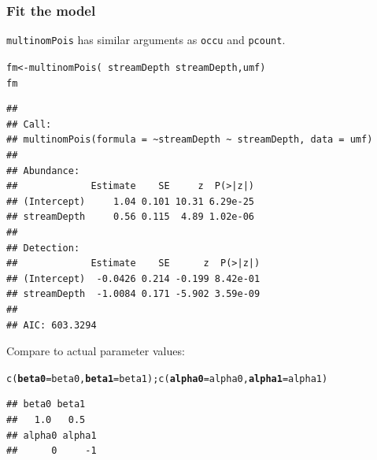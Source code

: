 \documentclass[color=usenames,dvipsnames]{beamer}\usepackage[]{graphicx}\usepackage[]{xcolor}
\makeatletter
\newcommand{\hlopt}[1]{\textcolor[rgb]{0,0,0}{#1}}%
\newcommand{\hlstd}[1]{\textcolor[rgb]{0,0,0}{#1}}%
\newcommand{\hlkwb}[1]{\textcolor[rgb]{0,0.341,0.682}{#1}}%
\newcommand{\hlkwc}[1]{\textcolor[rgb]{0,0,0}{\textbf{#1}}}%
\newcommand{\hlkwd}[1]{\textcolor[rgb]{0.004,0.004,0.506}{#1}}%
\newenvironment{kframe}{%
 \def\at@end@of@kframe{}%
 \ifinner\ifhmode%
  \def\at@end@of@kframe{\end{minipage}}%
  \begin{minipage}{\columnwidth}%
 \fi\fi%
 \def\FrameCommand##1{\hskip\@totalleftmargin \hskip-\fboxsep
 \colorbox{shadecolor}{##1}\hskip-\fboxsep
     \hskip-\linewidth \hskip-\@totalleftmargin \hskip\columnwidth}%
 \MakeFramed {\advance\hsize-\width
   \@totalleftmargin\z@ \linewidth\hsize
   \@setminipage}}%
 {\par\unskip\endMakeFramed%
 \at@end@of@kframe}
\newenvironment{knitrout}{}{} %
\newcommand{\inr}[1]{\colorbox{inlinecolor}{\texttt{#1}}}
\makeatother
\begin{document}
\begin{frame}[fragile]
  \frametitle{Fit the model}
  \footnotesize
  \inr{multinomPois} has similar arguments as \inr{occu} and
  \inr{pcount}. 
\begin{knitrout}\tiny
{}\color{fgcolor}\begin{kframe}
\begin{alltt}
\hlstd{fm} \hlkwb{<-} \hlkwd{multinomPois}\hlstd{(}\hlopt{~}\hlstd{streamDepth} \hlopt{~}\hlstd{streamDepth, umf)}
\hlstd{fm}
\end{alltt}
\begin{verbatim}
## 
## Call:
## multinomPois(formula = ~streamDepth ~ streamDepth, data = umf)
## 
## Abundance:
##             Estimate    SE     z  P(>|z|)
## (Intercept)     1.04 0.101 10.31 6.29e-25
## streamDepth     0.56 0.115  4.89 1.02e-06
## 
## Detection:
##             Estimate    SE      z  P(>|z|)
## (Intercept)  -0.0426 0.214 -0.199 8.42e-01
## streamDepth  -1.0084 0.171 -5.902 3.59e-09
## 
## AIC: 603.3294
\end{verbatim}
\end{kframe}
\end{knitrout}
\pause
\vfill
Compare to actual parameter values:
\vspace{-6pt}
\begin{knitrout}\tiny
{}\color{fgcolor}\begin{kframe}
\begin{alltt}
\hlkwd{c}\hlstd{(}\hlkwc{beta0}\hlstd{=beta0,} \hlkwc{beta1}\hlstd{=beta1);} \hlkwd{c}\hlstd{(}\hlkwc{alpha0}\hlstd{=alpha0,} \hlkwc{alpha1}\hlstd{=alpha1)}
\end{alltt}
\begin{verbatim}
## beta0 beta1 
##   1.0   0.5
## alpha0 alpha1 
##      0     -1
\end{verbatim}
\end{kframe}
\end{knitrout}
\end{frame}
\end{document}
